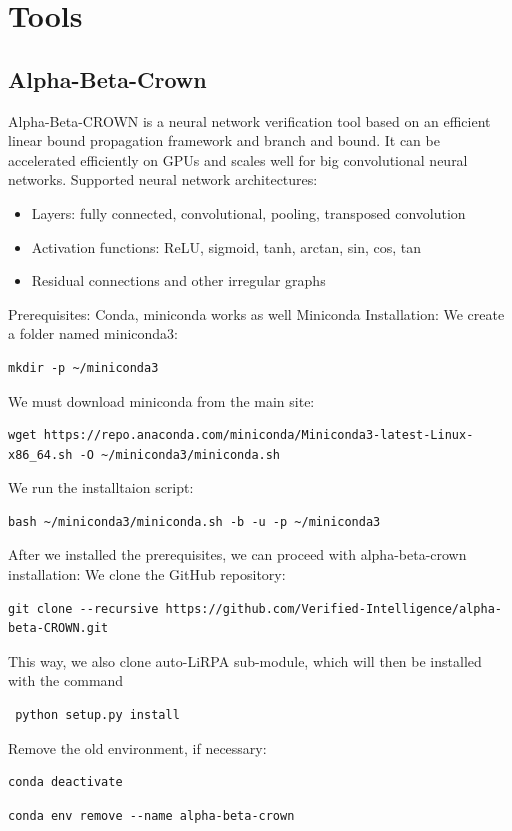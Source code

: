 \documentclass{article}
\begin{document}
\section{Tools}
\subsection{Alpha-Beta-Crown}
Alpha-Beta-CROWN is a neural network verification tool based on an efficient linear bound propagation framework and branch and bound. It can be accelerated efficiently on GPUs and scales well for big convolutional neural networks.\newline
Supported neural network architectures:
\begin{itemize}
\item Layers: fully connected, convolutional, pooling, transposed convolution
\item Activation functions: ReLU, sigmoid, tanh, arctan, sin, cos, tan
\item Residual connections and other irregular graphs
\end{itemize}

Prerequisites: Conda, miniconda works as well
Miniconda Installation:
We create a folder named miniconda3:

\begin{verbatim}mkdir -p ~/miniconda3\end{verbatim}
We must download miniconda from the main site:
\begin{verbatim}wget https://repo.anaconda.com/miniconda/Miniconda3-latest-Linux-x86_64.sh -O ~/miniconda3/miniconda.sh\end{verbatim}
We run the installtaion script:
\begin{verbatim}bash ~/miniconda3/miniconda.sh -b -u -p ~/miniconda3
\end{verbatim}

After we installed the prerequisites, we can proceed with alpha-beta-crown installation:
We clone the GitHub repository:
\begin{verbatim}git clone --recursive https://github.com/Verified-Intelligence/alpha-beta-CROWN.git\end{verbatim}
This way, we also clone auto-LiRPA sub-module, which will then be installed with the command \begin{verbatim} python setup.py install\end{verbatim}
Remove the old environment, if necessary:
\begin{verbatim}conda deactivate\end{verbatim}
\begin{verbatim}conda env remove --name alpha-beta-crown\end{verbatim}
\end{document}
